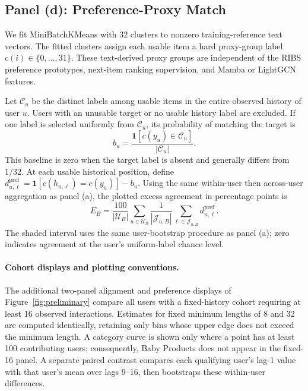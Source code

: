 ﻿\documentclass[sigconf,anonymous,review]{acmart}
\begin{document}
\subsection{Panel (d): Preference-Proxy Match}
\label{app:preliminary_match}
We fit MiniBatchKMeans with 32 clusters to nonzero training-reference text vectors. The fitted clusters assign each usable item a hard proxy-group label $c(i)\in\{0,\ldots,31\}$. These text-derived proxy groups are independent of the RIBS preference prototypes, next-item ranking supervision, and Mamba or LightGCN features.

Let $\mathcal C_u$ be the distinct labels among usable items in the entire observed history of user $u$. Users with an unusable target or no usable history label are excluded. If one label is selected uniformly from $\mathcal C_u$, its probability of matching the target is
\begin{equation}
 b_u=\frac{\mathbf 1[c(y_u)\in\mathcal C_u]}{|\mathcal C_u|}.
 \label{eq:prelim_preference_baseline}
\end{equation}
This baseline is zero when the target label is absent and generally differs from $1/32$. At each usable historical position, define $d^{\mathrm{pref}}_{u,\ell}=\mathbf 1[c(h_{u,\ell})=c(y_u)]-b_u$. Using the same within-user then across-user aggregation as panel (a), the plotted excess agreement in percentage points is
\begin{equation}
 E_B=\frac{100}{|\mathcal U_B|}
 \sum_{u\in\mathcal U_B}\frac{1}{|\mathcal J_{u,B}|}
 \sum_{\ell\in\mathcal J_{u,B}}d^{\mathrm{pref}}_{u,\ell}.
 \label{eq:prelim_preference_match}
\end{equation}
The shaded interval uses the same user-bootstrap procedure as panel (a); zero indicates agreement at the user's uniform-label chance level.

\paragraph{Cohort displays and plotting conventions.}
The additional two-panel alignment and preference displays of Figure~\ref{fig:preliminary} compare all users with a fixed-history cohort requiring at least 16 observed interactions. Estimates for fixed minimum lengths of 8 and 32 are computed identically, retaining only bins whose upper edge does not exceed the minimum length. A category curve is shown only where a point has at least 100 contributing users; consequently, Baby Products does not appear in the fixed-16 panel. A separate paired contrast compares each qualifying user's lag-1 value with that user's mean over lags 9--16, then bootstraps these within-user differences.
\end{document}
